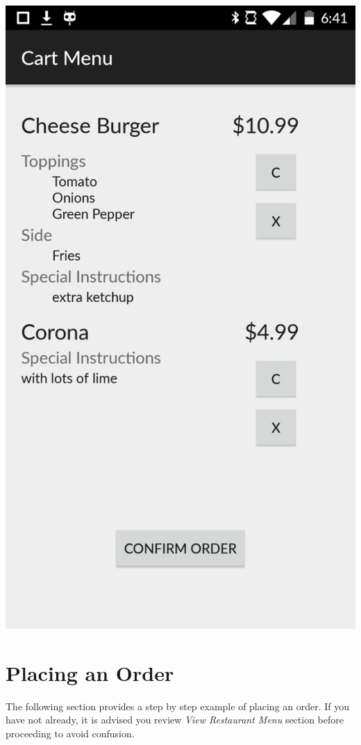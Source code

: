 \documentclass[12pt, titlepage]{article}
\begin{document}
\begin{center}\includegraphics[scale=0.15]{cart.png}\end{center}

\section{Placing an Order}
The following section provides a step by step example of placing an order. If you have not already, it is advised you review \emph{View Restaurant Menu} section before proceeding to avoid confusion. 
\end{document}
